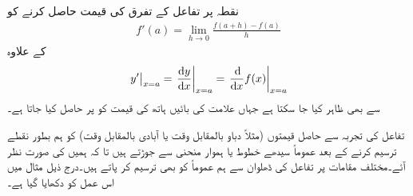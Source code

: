 نقطہ  پر تفاعل  کے تفرق کی قیمت حاصل کرنے کو
\begin{align*}
f'(a)=\lim_{h\to 0}\frac{f(a+h)-f(a)}{h}
\end{align*}
کے علاوہ
\begin{align*}
\left. y' \right \vert_{x=a}=\left. \frac{\dif y}{\dif x} \right\vert_{x=a}=\left. \frac{\dif}{\dif x}f(x) \right\vert_{x=a}
\end{align*}
سے بھی ظاہر کیا جا سکتا ہے جہاں  علامت کی بائیں ہاتھ کی قیمت کو  پر حاصل کیا جاتا ہے۔ 

تفاعل  کی تجربہ سے حاصل قیمتوں (مثلاً دباو بالمقابل وقت یا آبادی بالمقابل وقت) کو ہم بطور نقطے ترسیم کرنے کے بعد عموماً سیدھے خطوط یا ہموار منحنی سے جوڑتے ہیں تا کہ ہمیں  کی صورت نظر آئے۔مختلف مقامات پر تفاعل کی ڈھلوان  سے ہم عموماً  کو بھی ترسیم کر پاتے ہیں۔درج ذیل مثال میں اس عمل کو دکھایا گیا ہے۔

